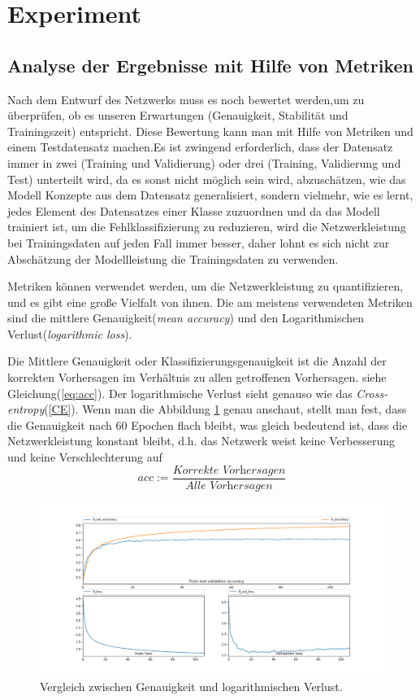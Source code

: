 \documentclass[12pt,a4paper]{scrartcl}
\numberwithin{equation}{section}
\begin{document}
\section{Experiment} \label{Experiment}

\subsection{Analyse der Ergebnisse mit Hilfe von Metriken}
Nach dem Entwurf des Netzwerks muss es noch bewertet werden,um zu überprüfen, ob es unseren Erwartungen (Genauigkeit, Stabilität und Trainingszeit) entspricht. Diese Bewertung kann man mit Hilfe von Metriken und einem Testdatensatz machen.Es ist zwingend erforderlich, dass der Datensatz immer in zwei (Training und Validierung) oder drei (Training, Validierung und Test) unterteilt wird, da es sonst nicht möglich sein wird, abzuschätzen, wie das Modell Konzepte aus dem Datensatz generalisiert, sondern vielmehr, wie es lernt, jedes Element des Datensatzes einer Klasse zuzuordnen und da das Modell trainiert ist, um die Fehlklassifizierung zu reduzieren, wird die Netzwerkleistung bei Trainingsdaten auf jeden Fall immer besser, daher lohnt es sich nicht zur Abschätzung der Modellleistung die Trainingsdaten zu verwenden.

Metriken können verwendet werden, um die Netzwerkleistung zu quantifizieren, und es gibt eine große Vielfalt von ihnen. Die am meistens verwendeten Metriken sind  die mittlere Genauigkeit(\textit{mean accuracy}) und den Logarithmischen Verlust(\textit{logarithmic loss}).

Die Mittlere Genauigkeit oder Klassifizierungsgenauigkeit ist die Anzahl der korrekten Vorhersagen im Verhältnis zu allen getroffenen Vorhersagen. siehe Gleichung(\ref{eq:acc}).
Der logarithmische Verlust sieht genauso wie das \textit{Cross-entropy}(\ref{CE}). Wenn man die Abbildung \ref{fig:accVSlogLoss} genau anschaut, stellt man fest, dass die Genauigkeit nach 60 Epochen flach bleibt, was gleich bedeutend ist, dass die Netzwerkleistung konstant bleibt, d.h. das Netzwerk weist keine Verbesserung und keine Verschlechterung auf
\begin{equation}\label{eq:acc}
	acc := \dfrac{\textit{Korrekte Vorhersagen}}{\textit{Alle Vorhersagen}}
\end{equation}

\begin{figure}[h]
	\includegraphics[width=\textwidth]{accVSlogLoss}
	\caption{Vergleich zwischen Genauigkeit und logarithmischen Verlust. }
	\label{fig:accVSlogLoss}
\end{figure}
\end{document}
